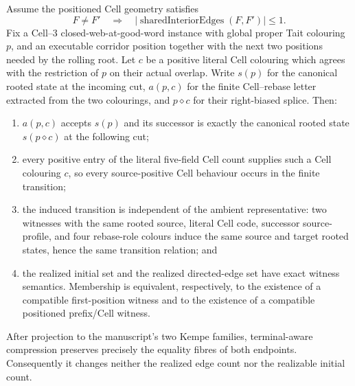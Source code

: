 \begin{theorem}
\label{thm:exact-rooted-cell-factorization}
Assume the positioned Cell geometry satisfies
\[
  \tag{U}
  F\ne F'\quad\Longrightarrow\quad
  |\operatorname{sharedInteriorEdges}(F,F')|\le1.
\]
Fix a Cell--3 closed-web-at-good-word instance with global proper Tait
colouring $p$, and an executable corridor position together with the next two
positions needed by the rolling root.  Let $c$ be a positive literal Cell
colouring which agrees with the restriction of $p$ on their actual overlap.
Write $s(p)$ for the canonical rooted state at
the incoming cut, $a(p,c)$ for the finite Cell--rebase letter extracted from
the two colourings, and $p\diamond c$ for their right-biased splice.  Then:
\begin{enumerate}
\item $a(p,c)$ accepts $s(p)$ and its successor is exactly the canonical
  rooted state $s(p\diamond c)$ at the following cut;
\item every positive entry of the literal five-field Cell count supplies such
  a Cell colouring $c$, so every source-positive Cell behaviour occurs in the
  finite transition;
\item the induced transition is independent of the ambient representative:
  two witnesses with the same rooted source, literal Cell code, successor
  source-profile, and four rebase-role colours induce the same source and
  target rooted states, hence the same transition relation; and
\item the realized initial set and the realized directed-edge set have exact
  witness semantics.  Membership is equivalent, respectively, to the
  existence of a compatible first-position witness and to the existence of a
  compatible positioned prefix/Cell witness.
\end{enumerate}
After projection to the manuscript's two Kempe families, terminal-aware
compression preserves precisely the equality fibres of both endpoints.
Consequently it changes neither the realized edge count nor the realizable
initial count.
\end{theorem}

